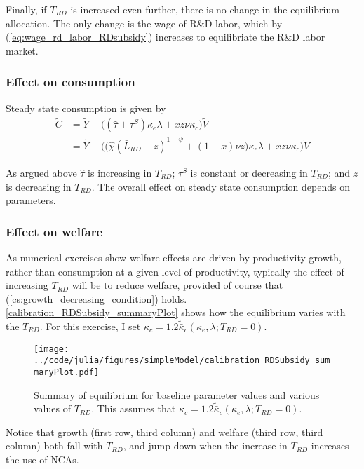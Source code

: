 \documentclass[11pt,english]{article}
\begin{document}
Finally, if $T_{RD}$ is increased even further, there is no change in the equilibrium allocation. The only change is the wage of R\&D labor, which by (\ref{eq:wage_rd_labor_RDsubsidy}) increases to equilibriate the R\&D labor market.

\subsubsection{Effect on consumption}

Steady state consumption is given by
\begin{align}
\tilde{C} &= \tilde{Y} - \Big( (\hat{\tau}  + \tau^S)\kappa_e \lambda + x z \nu \kappa_c \Big) \tilde{V} \\
&= \tilde{Y} - \Big( \big( \hat{\chi} (\bar{L}_{RD} - z)^{1-\psi} + (1-x) \nu z \big) \kappa_e \lambda + x z \nu \kappa_c \Big) \tilde{V}  \label{cs:scen2:consumption_eq}
\end{align}

As argued above $\hat{\tau}$ is increasing in $T_{RD}$; $\tau^S$ is constant or decreasing in $T_{RD}$; and $z$ is decreasing in $T_{RD}$. The overall effect on steady state consumption depends on parameters. 

\subsubsection{Effect on welfare}

As numerical exercises show welfare effects are driven by productivity growth, rather than consumption at a given level of productivity, typically the effect of increasing $T_{RD}$ will be to reduce welfare, provided of course that (\ref{cs:growth_decreasing_condition}) holds. \autoref{calibration_RDSubsidy_summaryPlot} shows how the equilibrium varies with the $T_{RD}$. For this exercise, I set $\kappa_c = 1.2 \tilde{\bar{\kappa}}_c(\kappa_e,\lambda;T_{RD} = 0)$. 

\begin{figure}[]
	\texttt{[image: ../code/julia/figures/simpleModel/calibration\_RDSubsidy\_summaryPlot.pdf]}
	\caption{Summary of equilibrium for baseline parameter values and various values of $T_{RD}$. This assumes that $\kappa_c = 1.2 \tilde{\bar{\kappa}}_c(\kappa_e,\lambda;T_{RD} = 0)$.}
	\label{calibration_RDSubsidy_summaryPlot}
\end{figure}

Notice that growth (first row, third column) and welfare (third row, third column) both fall with $T_{RD}$, and jump down when the increase in $T_{RD}$ increases the use of NCAs.
\end{document}
